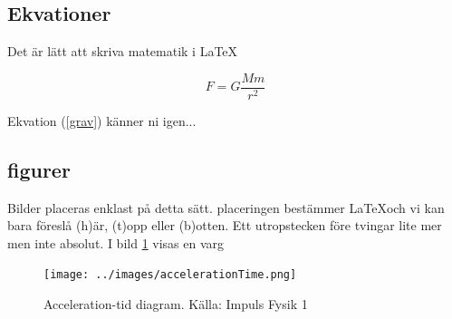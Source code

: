 \documentclass[11p]{article}
\begin{document}
    \subsection{Ekvationer}
    Det är lätt att skriva matematik i \LaTeX

    \begin{equation}
        F = G \frac{M m}{r^2}
        \label{grav}
    \end{equation}

    Ekvation (\ref{grav}) känner ni igen...

    \subsection{figurer}
    Bilder placeras enklast på detta sätt. placeringen bestämmer \LaTeX och vi kan bara föreslå (h)är, (t)opp eller (b)otten. Ett utropstecken före tvingar lite mer men inte absolut. I bild \ref{varg} visas en varg
    \begin{figure}[!h]
        \texttt{[image: ../images/accelerationTime.png]}
        \caption{Acceleration-tid diagram. Källa: Impuls Fysik 1}
        \label{varg}
    \end{figure}
    \printbibliography
\end{document}
